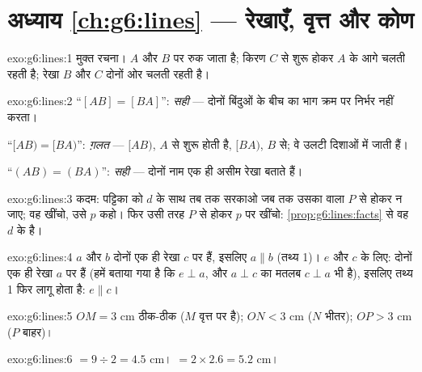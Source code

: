 \section*{अध्याय \ref{ch:g6:lines} --- रेखाएँ, वृत्त और कोण}

\begin{solution}{exo:g6:lines:1}
मुक्त रचना।  $A$ और $B$ पर रुक जाता है; किरण $C$ से शुरू
होकर $A$ के आगे चलती रहती है; रेखा $B$ और $C$ दोनों ओर चलती
रहती है।
\end{solution}

\begin{solution}{exo:g6:lines:2}
``$[AB] = [BA]$'': \emph{सही} --- दोनों बिंदुओं के बीच का भाग
क्रम पर निर्भर नहीं करता।

``$[AB) = [BA)$'': \emph{ग़लत} --- $[AB)$, $A$ से शुरू होती है,
$[BA)$, $B$ से; वे उलटी दिशाओं में जाती हैं।

``$(AB) = (BA)$'': \emph{सही} --- दोनों नाम एक ही असीम रेखा
बताते हैं।
\end{solution}

\begin{solution}{exo:g6:lines:3}
कदम:  पट्टिका को $d$ के साथ तब तक सरकाओ जब तक उसका  वाला
 $P$ से होकर न जाए; वह  खींचो, उसे $p$ कहो। फिर उसी तरह
$P$ से होकर $p$ पर  खींचो: \cref{prop:g6:lines:facts} से वह
$d$ के  है।
\end{solution}

\begin{solution}{exo:g6:lines:4}
$a$ और $b$ दोनों एक ही रेखा $c$ पर  हैं, इसलिए
$a \parallel b$ (तथ्य 1)। $e$ और $c$ के लिए: दोनों एक ही रेखा
$a$ पर  हैं (हमें बताया गया है कि $e \perp a$, और $a \perp c$
का मतलब $c \perp a$ भी है), इसलिए तथ्य 1 फिर लागू होता है: $e \parallel c$।
\end{solution}

\begin{solution}{exo:g6:lines:5}
$OM = 3$ cm ठीक-ठीक ($M$ वृत्त पर है); $ON < 3$ cm ($N$ भीतर);
$OP > 3$ cm ($P$ बाहर)।
\end{solution}

\begin{solution}{exo:g6:lines:6}
 $= 9 \div 2 = 4.5$ cm। \quad {} $= 2 \times 2.6 = 5.2$ cm।
\end{solution}

